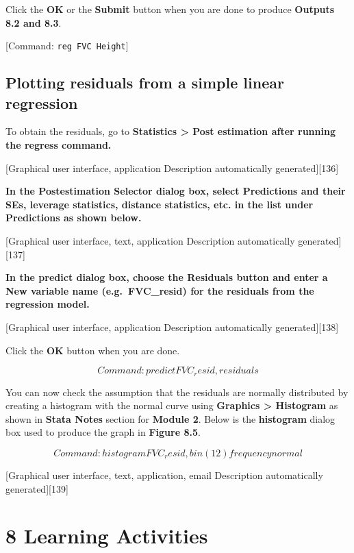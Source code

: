 \documentclass[
]{memoir}
\begin{document}
Click the \textbf{OK} or the \textbf{Submit} button when you are done to produce \textbf{Outputs 8.2 and 8.3}.

{[}Command: \texttt{reg\ FVC\ Height}{]}

\hypertarget{plotting-residuals-from-a-simple-linear-regression}{%
\section{Plotting residuals from a simple linear regression}\label{plotting-residuals-from-a-simple-linear-regression}}

To obtain the residuals, go to \textbf{Statistics \textgreater{} Post estimation after running the regress command.}

{[}Graphical user interface, application Description automatically generated{]}{[}136{]}

\textbf{In the Postestimation Selector dialog box, select Predictions and their SEs, leverage statistics, distance statistics, etc. in the list under Predictions as shown below.}

{[}Graphical user interface, text, application Description automatically generated{]}{[}137{]}

\textbf{In the predict dialog box, choose the Residuals button and enter a New variable name (e.g.~FVC\_resid) for the residuals from the regression model.}

{[}Graphical user interface, application Description automatically generated{]}{[}138{]}

Click the \textbf{OK} button when you are done.

\emph{\[Command: predict FVC_resid, residuals\]}

You can now check the assumption that the residuals are normally distributed by creating a histogram with the normal curve using \textbf{Graphics \textgreater{} Histogram} as shown in \textbf{Stata Notes} section for \textbf{Module 2}. Below is the \textbf{histogram} dialog box used to produce the graph in \textbf{Figure 8.5}.

\emph{\[Command: histogram FVC_resid, bin(12) frequency normal\]}

{[}Graphical user interface, text, application, email Description automatically generated{]}{[}139{]}

\hypertarget{learning-activities-7}{%
\chapter*{\texorpdfstring{\textbf{8} Learning Activities}{8 Learning Activities}}\label{learning-activities-7}}
\end{document}
